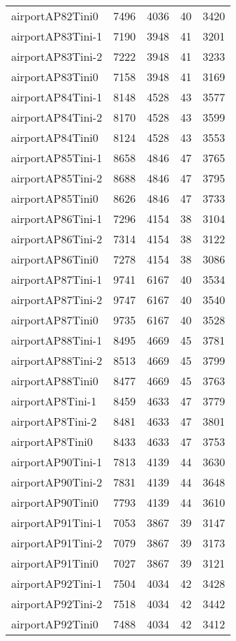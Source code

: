 \documentclass[../../../thesis.tex]{subfiles}
\begin{document}
\begin{longtable}{lrrrr}
airportAP82Tini0 & 7496 & 4036 & 40 & 3420 \\
airportAP83Tini-1 & 7190 & 3948 & 41 & 3201 \\
airportAP83Tini-2 & 7222 & 3948 & 41 & 3233 \\
airportAP83Tini0 & 7158 & 3948 & 41 & 3169 \\
airportAP84Tini-1 & 8148 & 4528 & 43 & 3577 \\
airportAP84Tini-2 & 8170 & 4528 & 43 & 3599 \\
airportAP84Tini0 & 8124 & 4528 & 43 & 3553 \\
airportAP85Tini-1 & 8658 & 4846 & 47 & 3765 \\
airportAP85Tini-2 & 8688 & 4846 & 47 & 3795 \\
airportAP85Tini0 & 8626 & 4846 & 47 & 3733 \\
airportAP86Tini-1 & 7296 & 4154 & 38 & 3104 \\
airportAP86Tini-2 & 7314 & 4154 & 38 & 3122 \\
airportAP86Tini0 & 7278 & 4154 & 38 & 3086 \\
airportAP87Tini-1 & 9741 & 6167 & 40 & 3534 \\
airportAP87Tini-2 & 9747 & 6167 & 40 & 3540 \\
airportAP87Tini0 & 9735 & 6167 & 40 & 3528 \\
airportAP88Tini-1 & 8495 & 4669 & 45 & 3781 \\
airportAP88Tini-2 & 8513 & 4669 & 45 & 3799 \\
airportAP88Tini0 & 8477 & 4669 & 45 & 3763 \\
airportAP8Tini-1 & 8459 & 4633 & 47 & 3779 \\
airportAP8Tini-2 & 8481 & 4633 & 47 & 3801 \\
airportAP8Tini0 & 8433 & 4633 & 47 & 3753 \\
airportAP90Tini-1 & 7813 & 4139 & 44 & 3630 \\
airportAP90Tini-2 & 7831 & 4139 & 44 & 3648 \\
airportAP90Tini0 & 7793 & 4139 & 44 & 3610 \\
airportAP91Tini-1 & 7053 & 3867 & 39 & 3147 \\
airportAP91Tini-2 & 7079 & 3867 & 39 & 3173 \\
airportAP91Tini0 & 7027 & 3867 & 39 & 3121 \\
airportAP92Tini-1 & 7504 & 4034 & 42 & 3428 \\
airportAP92Tini-2 & 7518 & 4034 & 42 & 3442 \\
airportAP92Tini0 & 7488 & 4034 & 42 & 3412 \\

\end{longtable}
\end{document}
